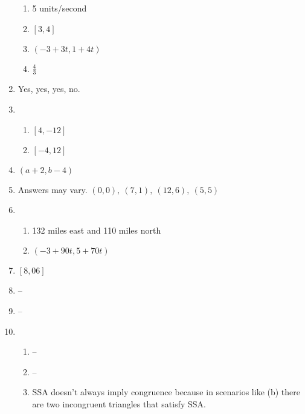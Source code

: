 \documentclass{article}
\begin{document}
\begin{enumerate}
\begin{enumerate}
	\item 5 units/second
	
	\item $[3, 4]$
	
	\item $(-3 + 3t, 1 + 4t)$
	
	\item $\frac{4}{3}$
	
	\end{enumerate}
	
\item Yes, yes, yes, no.

\item

	\begin{enumerate}
	
	\item $[4, -12]$
	
	\item $[-4, 12]$
	
	\end{enumerate}
	
\item $(a + 2, b - 4)$

\item Answers may vary. $(0,0), \ (7,1), \ (12, 6), \ (5, 5)$

\item

	\begin{enumerate}

	\item 132 miles east and 110 miles north
	
	\item $(-3 + 90t, 5 + 70t)$

	\end{enumerate}
	
\item $[8, 06]$

\item --

\item --

\item

	\begin{enumerate}
	
	\item --
	
	\item --
	
	\item SSA doesn't always imply congruence because in scenarios like (b) there are two incongruent triangles that satisfy SSA. 
	

\end{enumerate}
\end{enumerate}
\end{document}
